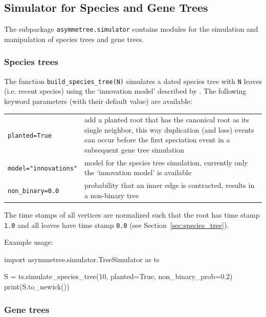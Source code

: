 \documentclass[hidelinks,11pt]{scrreprt}
\begin{document}
\subsection{Simulator for Species and Gene Trees}

The subpackage \texttt{asymmetree.simulator} contains modules for the simulation and manipulation of species trees and gene trees.

\subsubsection{Species trees}

The function \texttt{build\_species\_tree(N)} simulates a dated species tree with \texttt{N} leaves (i.e. recent species) using the `innovation model' described by \citet{keller-schmidt2012}.
The following keyword parameters (with their default value) are available:

\vspace{3mm}
\renewcommand{\arraystretch}{1.5}
\begin{tabularx}{0.95\textwidth} { >{\raggedright\arraybackslash}p{4cm} >{\raggedright\arraybackslash}X }
	\texttt{planted=True} & add a planted root that has the canonical root as its
	single neighbor, this way duplication (and loss) events can occur before the first speciation event in a subsequent gene tree simulation\\
	\texttt{model="innovations"}  & model for the species tree simulation, currently only the `innovation model' is available\\
	\texttt{non\_binary=0.0} & probability that an inner edge is contracted,
	results in a non-binary tree\\
\end{tabularx}
\vspace{3mm}

The time stamps of all vertices are normalized such that the root has time stamp \texttt{1.0} and all leaves have time stamp \texttt{0.0} (see Section~\ref{sec:species_tree}).

Example usage:
\vspace{2mm}
\begin{python}
import asymmetree.simulator.TreeSimulator as ts

S = ts.simulate_species_tree(10, planted=True, non_binary_prob=0.2)
print(S.to_newick())
\end{python}
\vspace{2mm}

\subsubsection{Gene trees}
\end{document}
